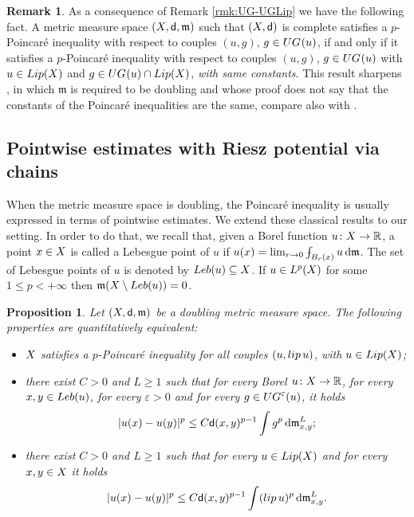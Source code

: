 \documentclass[12pt]{amsart}
\newcommand{\R}{\mathbb{R}}
\newcommand{\sfd}{{\sf d}}
\renewcommand{\d}{{\mathrm d}}
\newcommand{\X}{{\rm X}}
\newcommand{\lip}{{\rm lip}}
\newcommand{\Lip}{{\rm Lip}}
\newcommand{\mm}{\mathfrak m}
\def\Xint#1{\mathchoice
{\XXint\displaystyle\textstyle{#1}}%
{\XXint\textstyle\scriptstyle{#1}}%
{\XXint\scriptstyle\scriptscriptstyle{#1}}%
{\XXint\scriptscriptstyle\scriptscriptstyle{#1}}%
\!\int}
\def\XXint#1#2#3{{\setbox0=\hbox{$#1{#2#3}{\int}$ }
\vcenter{\hbox{$#2#3$ }}\kern-.6\wd0}}
\def\dashint{\Xint-}
\newtheorem{proposition}[theorem]{Proposition}
\theoremstyle{definition}
\newtheorem{remark}[theorem]{Remark}
\newcommand{\UG}[1]{{\rm UG}^{#1}}
\begin{document}
%
\begin{remark}
    As a consequence of Remark \ref{rmk:UG-UGLip} we have the following fact. A metric measure space $(\X,\sfd,\mm)$ such that $(\X,\sfd)$ is complete satisfies a $p$-Poincaré inequality with respect to couples $(u,g)$, $g\in \UG{}(u)$, if and only if it satisfies a $p$-Poincaré inequality with respect to couples $(u,g)$, $g\in \UG{}(u)$ with $u \in \Lip(\X)$ and $g\in \UG{}(u) \cap \Lip(\X)$, \emph{with same constants}.
    This result sharpens \cite[Theorem 2]{Kei03}, in which $\mm$ is required to be doubling and whose proof does not say that the constants of the Poincaré inequalities are the same, compare also with \cite[Theorem 8.4.1]{HKST15}.
\end{remark}
\subsection{Pointwise estimates with Riesz potential via chains}
\label{sec:pt_estimates_chains}
When the metric measure space is doubling, the Poincaré inequality is usually expressed in terms of pointwise estimates. We extend these classical results to our setting. In order to do that, we recall that, given a Borel function $u\colon \X \to \R$, a point $x\in \X$ is called a Lebesgue point of $u$ if $u(x) = \lim_{r\to 0} \dashint_{B_r(x)} u\,\d\mm$. The set of Lebesgue points of $u$ is denoted by ${\rm Leb}(u) \subseteq \X$. If $u\in L^p(\X)$ for some $1\le p < +\infty$ then $\mm(\X\setminus{\rm Leb}(u)) = 0$.
%
\begin{proposition}
\label{prop:PI_equiv_pointwise}
    Let $(\X,\sfd,\mm)$ be a doubling metric measure space. The following properties are quantitatively equivalent:
    \begin{itemize}
        \item[(i)] $\X$ satisfies a $p$-Poincaré inequality for all couples $(u,\lip\,u)$, with $u\in \Lip(\X)$;
        \item[(ii)] there exist $C >0$ and $L\ge 1$ such that for every Borel $u\colon \X \to \R$, for every $x,y\in {\rm Leb}(u)$, for every $\varepsilon > 0$ and for every $g\in \UG{\varepsilon}(u)$, it holds 
        \begin{equation}
            \label{eq:ptwise_PI_chain_UG}
            \vert u(x) - u(y) \vert ^p \le C\sfd(x,y)^{p-1}\int g^p \,\d\mm_{x,y}^L;
        \end{equation}
        \item[(iii)] there exist $C >0$ and $L\ge 1$ such that for every $u\in \Lip(\X)$ and for every $x,y\in \X$ it holds 
        \begin{equation}
            \label{eq:ptwise_PI_lip}
            \vert u(x) - u(y) \vert ^p \le C\sfd(x,y)^{p-1}\int (\lip\,u)^p \,\d\mm_{x,y}^L.
        \end{equation}
    \end{itemize}
\end{proposition}
\end{document}

